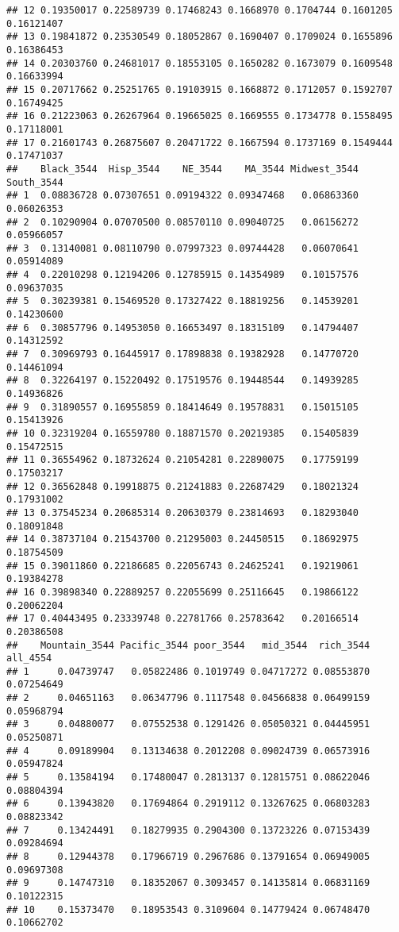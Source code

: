 \documentclass[
]{article}
\begin{document}
\begin{verbatim}
## 12 0.19350017 0.22589739 0.17468243 0.1668970 0.1704744 0.1601205 0.16121407
## 13 0.19841872 0.23530549 0.18052867 0.1690407 0.1709024 0.1655896 0.16386453
## 14 0.20303760 0.24681017 0.18553105 0.1650282 0.1673079 0.1609548 0.16633994
## 15 0.20717662 0.25251765 0.19103915 0.1668872 0.1712057 0.1592707 0.16749425
## 16 0.21223063 0.26267964 0.19665025 0.1669555 0.1734778 0.1558495 0.17118001
## 17 0.21601743 0.26875607 0.20471722 0.1667594 0.1737169 0.1549444 0.17471037
##    Black_3544  Hisp_3544    NE_3544    MA_3544 Midwest_3544 South_3544
## 1  0.08836728 0.07307651 0.09194322 0.09347468   0.06863360 0.06026353
## 2  0.10290904 0.07070500 0.08570110 0.09040725   0.06156272 0.05966057
## 3  0.13140081 0.08110790 0.07997323 0.09744428   0.06070641 0.05914089
## 4  0.22010298 0.12194206 0.12785915 0.14354989   0.10157576 0.09637035
## 5  0.30239381 0.15469520 0.17327422 0.18819256   0.14539201 0.14230600
## 6  0.30857796 0.14953050 0.16653497 0.18315109   0.14794407 0.14312592
## 7  0.30969793 0.16445917 0.17898838 0.19382928   0.14770720 0.14461094
## 8  0.32264197 0.15220492 0.17519576 0.19448544   0.14939285 0.14936826
## 9  0.31890557 0.16955859 0.18414649 0.19578831   0.15015105 0.15413926
## 10 0.32319204 0.16559780 0.18871570 0.20219385   0.15405839 0.15472515
## 11 0.36554962 0.18732624 0.21054281 0.22890075   0.17759199 0.17503217
## 12 0.36562848 0.19918875 0.21241883 0.22687429   0.18021324 0.17931002
## 13 0.37545234 0.20685314 0.20630379 0.23814693   0.18293040 0.18091848
## 14 0.38737104 0.21543700 0.21295003 0.24450515   0.18692975 0.18754509
## 15 0.39011860 0.22186685 0.22056743 0.24625241   0.19219061 0.19384278
## 16 0.39898340 0.22889257 0.22055699 0.25116645   0.19866122 0.20062204
## 17 0.40443495 0.23339748 0.22781766 0.25783642   0.20166514 0.20386508
##    Mountain_3544 Pacific_3544 poor_3544   mid_3544  rich_3544   all_4554
## 1     0.04739747   0.05822486 0.1019749 0.04717272 0.08553870 0.07254649
## 2     0.04651163   0.06347796 0.1117548 0.04566838 0.06499159 0.05968794
## 3     0.04880077   0.07552538 0.1291426 0.05050321 0.04445951 0.05250871
## 4     0.09189904   0.13134638 0.2012208 0.09024739 0.06573916 0.05947824
## 5     0.13584194   0.17480047 0.2813137 0.12815751 0.08622046 0.08804394
## 6     0.13943820   0.17694864 0.2919112 0.13267625 0.06803283 0.08823342
## 7     0.13424491   0.18279935 0.2904300 0.13723226 0.07153439 0.09284694
## 8     0.12944378   0.17966719 0.2967686 0.13791654 0.06949005 0.09697308
## 9     0.14747310   0.18352067 0.3093457 0.14135814 0.06831169 0.10122315
## 10    0.15373470   0.18953543 0.3109604 0.14779424 0.06748470 0.10662702

\end{verbatim}
\end{document}
